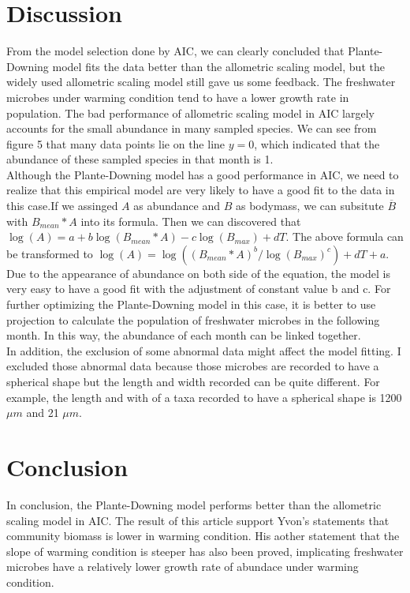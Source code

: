 \documentclass[11pt]{article}
\begin{document}
\begin{linenumbers}
\section*{Discussion}
From the model selection done by AIC, we can clearly concluded that Plante-Downing model fits the data better than the allometric scaling model, but the widely used allometric scaling model still gave us some feedback. The freshwater microbes under warming condition tend to have a lower growth rate in population. The bad performance of allometric scaling model in AIC largely accounts for the small abundance in many sampled species. We can see from figure 5 that many data points lie on the line $y= 0$, which indicated that the abundance of these sampled species in that month is 1. \\
Although the Plante-Downing model has a good performance in AIC, we need to realize that this empirical model are very likely to have a good fit to the data in this case.If we assinged $A$ as abundance and $B$ as bodymass, we can subsitute $\overline{B}$ with ${B}_{mean}*A$ into its formula.
Then we can discovered that $ \log(A) = a +b \log({B}_{mean}*A) - c \log(\mathit{B}_{max}) + d T$.
The above formula can be transformed to $\log(A) = \log(({B}_{mean}*A)^b/\log(\mathit{B}_{max})^c) + d T + a$.
Due to the appearance of abundance on both side of the equation, the model is very easy to have a good fit with the adjustment of constant value b and c.
For further optimizing the Plante-Downing model in this case, it is better to use projection to calculate the population of freshwater microbes in the following month.
In this way, the abundance of each month can be linked together.  \\
In addition, the exclusion of some abnormal data might affect the model fitting. I excluded those abnormal data because those microbes are recorded to have a spherical shape but the length and width recorded can be quite different. For example, the length and with of a taxa recorded to have a spherical shape is 1200 $\mu m$ and 21 $\mu m$.

\section*{Conclusion}
In conclusion, the Plante-Downing model performs better than the allometric scaling model in AIC. The result of this article support Yvon's statements that community biomass is lower in warming condition. His aother statement that the slope of warming condition is steeper has also been proved, implicating freshwater microbes have a relatively lower growth rate of abundace under warming condition.



\newpage



\end{linenumbers}
\end{document}
